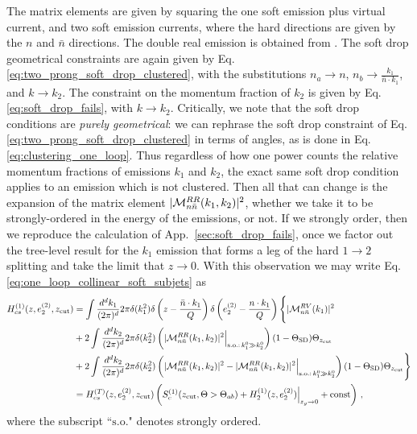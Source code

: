 \documentclass[a4paper,11pt]{article}
\newcommand{\nbar}{{\bar n}}
\newcommand{\ecf}[2]{e_{#1}^{(#2)}}
\newcommand{\nn}{\nonumber}
\def\zcut{z_{\text{cut}}}
\def\nbar{\bar n}
\DeclareRobustCommand{\App}[1]{App.~\ref{#1}}
\begin{document}
The matrix elements are given by squaring the one soft emission plus virtual current, and two soft emission currents, where the hard directions are given by the $n$ and $\nbar$ directions. The double real emission is obtained from \cite{Catani:2000pi}. The soft drop geometrical constraints are again given by Eq. \eqref{eq:two_prong_soft_drop_clustered}, with the substitutions $n_a\rightarrow n$, $n_b\rightarrow\frac{k_1}{\nbar\cdot k_1}$, and $k\rightarrow k_2$. The constraint on the momentum fraction of $k_2$ is given by Eq. \eqref{eq:soft_drop_fails}, with $k\rightarrow k_2$. Critically, we note that the soft drop conditions are \emph{purely geometrical}: we can rephrase the soft drop constraint of Eq. \eqref{eq:two_prong_soft_drop_clustered} in terms of angles, as is done in Eq. \eqref{eq:clustering_one_loop}. Thus regardless of how one power counts the relative momentum fractions of emissions $k_1$ and $k_2$, the exact same soft drop condition applies to an emission which is not clustered. Then all that can change is the expansion of the matrix element $|{\cal M}^{RR}_{n\nbar}(k_1,k_2)|^2$, whether we take it to be strongly-ordered in the energy of the emissions, or not. If we strongly order, then we reproduce the calculation of \App{sec:soft_drop_fails}, once we factor out the tree-level result for the $k_1$ emission that forms a leg of the hard $1\rightarrow 2$ splitting and take the limit that $z\rightarrow 0$. With this observation we may write Eq. \eqref{eq:one_loop_collinear_soft_subjets} as
{\small\begin{align}\label{eq:one_loop_collinear_soft_subjets_II}
H_{cs}^{(1)}(z,\ecf{2}{2},\zcut) &= \int \frac{d^dk_1}{(2\pi)^d} 2\pi\delta(k_1^2)\delta\left(z-\frac{\nbar\cdot k_1}{Q}\right)\delta\left(\ecf{2}{2}-\frac{n\cdot k_1}{Q}\right)\Bigg\{|{\cal M}^{RV}_{n\nbar}(k_1)|^2\nonumber\nonumber\\
&+2\int \frac{d^dk_2}{(2\pi)^d} 2\pi\delta(k_2^2)\left(|{\cal M}^{RR}_{n\nbar}(k_1,k_2)|^2\Big |_{\text{s.o.:}\, k_1^0\gg k_2^0}\right)(1-\Theta_{\text{SD}})\Theta_{\zcut}\nonumber\\
&+2\int \frac{d^dk_2}{(2\pi)^d} 2\pi\delta(k_2^2)\left( |{\cal M}^{RR}_{n\nbar}(k_1,k_2)|^2-|{\cal M}^{RR}_{n\nbar}(k_1,k_2)|^2\Big |_{\text{s.o.:}\, k_1^0\gg k_2^0}\right)(1-\Theta_{\text{SD}})\Theta_{\zcut}\Bigg\}\nn\\
&=H_{cs}^{(T)}(z,\ecf{2}{2},\zcut)\left(S^{(1)}_{c}(\zcut,\Theta>\Theta_{ab})+H^{(1)}_{2}(z,\ecf{2}{2})\Big|_{z_g\rightarrow 0}+\text{const}\right)\,,
\end{align}}
where the subscript ``$\text{s.o.}$" denotes strongly ordered.
\end{document}

